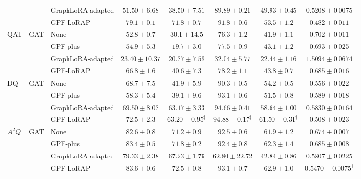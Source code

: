 \begin{table}[t]
{\begin{tabular}{lllccccc}
& & GraphLoRA-adapted & $51.50\pm6.68$ & $38.50\pm7.51$ & $89.89\pm0.21$ & $49.93\pm0.45$ & $0.5208\pm0.0075$ \\
& & GPF-LoRAP & $\mathbf{79.1\pm0.1}$ & $\mathbf{71.8\pm0.7}$ & $\mathbf{91.8\pm0.6}$ & $\mathbf{53.5\pm1.2}$ & $\mathbf{0.482\pm0.011}$ \\
\midrule
\midrule
\multirow{4}{*}{QAT} & \multirow{4}{*}{GAT} & None & $52.8\pm0.7$ & $\mathit{30.1\pm14.5}$ & $76.3\pm1.2$ & $41.9\pm1.1$ & $0.702\pm0.011$ \\
& & GPF-plus & $\mathit{54.9\pm5.3}$ & $19.7\pm3.0$ & $\mathit{77.5\pm0.9}$ & $\mathit{43.1\pm1.2}$ & $\mathit{0.693\pm0.025}$ \\
& & GraphLoRA-adapted & $23.40\pm10.37$ & $20.37\pm7.58$ & $32.04\pm5.77$ & $22.44\pm1.16$ & $1.5094\pm0.0674$ \\
& & GPF-LoRAP & $\mathbf{66.8\pm1.6}$ & $\mathbf{40.6\pm7.3}$ & $\mathbf{78.2\pm1.1}$ & $\mathbf{43.8\pm0.7}$ & $\mathbf{0.685\pm0.016}$ \\
\midrule
\multirow{4}{*}{DQ} & \multirow{4}{*}{GAT} & None & $68.7\pm7.5$ & $41.9\pm5.9$ & $90.3\pm0.5$ & $54.2\pm0.5$ & $\mathit{0.556\pm0.022}$ \\
& & GPF-plus & $58.3\pm5.4$ & $39.1\pm9.6$ & $93.1\pm0.6$ & $51.5\pm0.8$ & $0.589\pm0.018$ \\
& & GraphLoRA-adapted & $\mathit{69.50\pm8.03}$ & $\mathit{63.17\pm3.33}$ & $\mathit{94.66\pm0.41}$ & $\mathit{58.64\pm1.00}$ & $0.5830\pm0.0164$ \\
& & GPF-LoRAP & $\mathbf{72.5\pm2.3}$ & $\mathbf{63.20\pm0.95}^{\ddagger}$ & $\mathbf{94.88\pm0.17}^{\ddagger}$ & $\mathbf{61.50\pm0.31}^{\dagger}$ & $\mathbf{0.508\pm0.023}$ \\
\midrule
\multirow{4}{*}{$A^2Q$} & \multirow{4}{*}{GAT} & None & $82.6\pm0.8$ & $71.2\pm0.9$ & $\mathit{92.5\pm0.6}$ & $61.9\pm1.2$ & $0.674\pm0.007$ \\
& & GPF-plus & $\mathit{83.4\pm0.5}$ & $\mathit{71.8\pm0.2}$ & $92.4\pm0.8$ & $\mathit{62.3\pm1.4}$ & $0.685\pm0.008$ \\
& & GraphLoRA-adapted & $79.33\pm2.38$ & $67.23\pm1.76$ & $62.80\pm22.72$ & $42.84\pm0.86$ & $\mathit{0.5807\pm0.0225}$ \\
& & GPF-LoRAP & $\mathbf{83.6\pm0.6}$ & $\mathbf{72.5\pm0.8}$ & $\mathbf{93.1\pm0.7}$ & $\mathbf{62.9\pm1.0}$ & $\mathbf{0.5470\pm0.0075}^{\ddagger}$ \\
\bottomrule
\end{tabular}%
}
\par\vspace{3pt}

\end{table}
